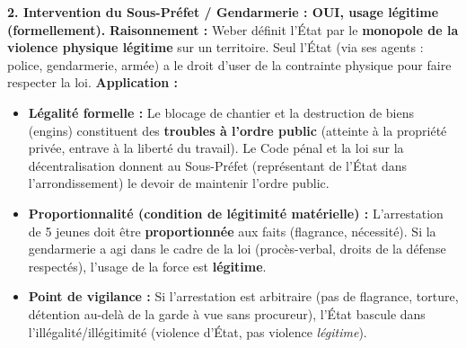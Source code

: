 \documentclass[11pt]{article}
\begin{document}
\begin{exoresolu}
\textbf{2. Intervention du Sous-Préfet / Gendarmerie : OUI, usage légitime (formellement).}
\textbf{Raisonnement :} Weber définit l'État par le \textbf{monopole de la violence physique légitime} sur un territoire. Seul l'État (via ses agents : police, gendarmerie, armée) a le droit d'user de la contrainte physique pour faire respecter la loi.
\textbf{Application :}
\begin{itemize}
    \item \textbf{Légalité formelle :} Le blocage de chantier et la destruction de biens (engins) constituent des \textbf{troubles à l'ordre public} (atteinte à la propriété privée, entrave à la liberté du travail). Le Code pénal et la loi sur la décentralisation donnent au Sous-Préfet (représentant de l'État dans l'arrondissement) le devoir de maintenir l'ordre public.
    \item \textbf{Proportionnalité (condition de légitimité matérielle) :} L'arrestation de 5 jeunes doit être \textbf{proportionnée} aux faits (flagrance, nécessité). Si la gendarmerie a agi dans le cadre de la loi (procès-verbal, droits de la défense respectés), l'usage de la force est \textbf{légitime}.
    \item \textbf{Point de vigilance :} Si l'arrestation est arbitraire (pas de flagrance, torture, détention au-delà de la garde à vue sans procureur), l'État bascule dans l'illégalité/illégitimité (violence d'État, pas violence \emph{légitime}).
\end{itemize}


\end{exoresolu}
\end{document}
